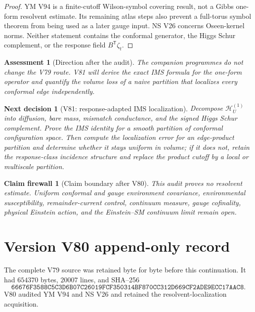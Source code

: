 \documentclass[11pt]{article}
\newtheorem{firewall}[theorem]{Claim firewall}
\newtheorem{decision}[theorem]{Next decision}
\newtheorem{assessment}[theorem]{Assessment}
\theoremstyle{remark}
\begin{document}
\begin{proof}
YM V94 is a finite-cutoff Wilson-symbol covering result, not a Gibbs
one-form resolvent estimate.  Its remaining atlas steps also prevent a
full-torus symbol theorem from being used as a later gauge input.  NS
V26 concerns Oseen-kernel norms.  Neither statement contains the
conformal generator, the Higgs Schur complement, or the response field
\(B^{\mathsf T}\zeta_t\).
\end{proof}

\begin{assessment}[Direction after the audit]
\label{ass:v17v80-direction}
The companion programmes do not change the V79 route.  V81 will derive
the exact IMS formula for the one-form operator and quantify the volume
loss of a naive partition that localizes every conformal edge
independently.
\end{assessment}

\begin{decision}[V81: response-adapted IMS localization]
\label{dec:v17v80-next}
Decompose \(\mathscr H_U^{(1)}\) into diffusion, bare mass, mismatch
conductance, and the signed Higgs Schur complement.  Prove the IMS
identity for a smooth partition of conformal configuration space.
Then compute the localization error for an edge-product partition and
determine whether it stays uniform in volume; if it does not, retain
the response-class incidence structure and replace the product cutoff
by a local or multiscale partition.
\end{decision}

\begin{firewall}[Claim boundary after V80]
\label{fire:v17v80}
This audit proves no resolvent estimate.  Uniform conformal and gauge
environment covariance, environmental susceptibility,
remainder-current control, continuum measure, gauge cofinality,
physical Einstein action, and the Einstein--SM continuum limit remain
open.
\end{firewall}

\section*{Version V80 append-only record}
The complete V79 source was retained byte for byte before this
continuation.  It had \(654370\) bytes, \(20007\) lines, and SHA--256
\[
 \texttt{66676F3588C5C3D6B07C26019FCF350314BF870CC312D669CF2ADE9ECC17AAC8}.
\]
V80 audited YM V94 and NS V26 and retained the resolvent-localization
acquisition.
\end{document}

